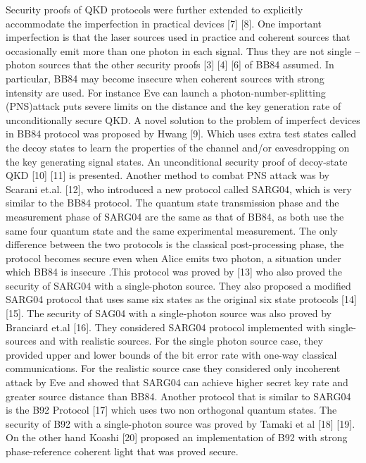 Security proofs of QKD protocols were further extended to explicitly accommodate the imperfection in practical devices [7] [8]. One important imperfection is that the laser sources used in practice and coherent sources that occasionally emit more than one photon in each signal. Thus they are not single –photon sources that the other security proofs [3] [4] [6] of BB84 assumed. In particular, BB84 may become insecure when coherent sources with strong intensity are used. For instance Eve can launch a photon-number-splitting (PNS)attack puts severe limits on the distance and the key generation rate of unconditionally secure QKD. A novel solution to the problem of imperfect devices in BB84 protocol was proposed by Hwang [9]. Which uses extra test states called the decoy states to learn the properties of the channel and/or eavesdropping on the key generating signal states. An unconditional security proof of decoy-state QKD [10] [11] is presented. Another method to combat PNS attack was by Scarani et.al. [12], who introduced a new protocol called SARG04, which is very similar to the BB84 protocol. The quantum state transmission phase and the measurement phase of SARG04 are the same as that of BB84, as both use the same four quantum state and the same experimental measurement. The only difference between the two protocols is the classical post-processing phase, the protocol becomes secure even when Alice emits two photon, a situation under which BB84 is insecure .This protocol was proved by [13] who also proved the security of SARG04 with a single-photon source. They also proposed a modified SARG04 protocol that uses same six states as the original six state protocols [14] [15]. The security of SAG04 with a single-photon source was also proved by Branciard et.al [16]. They considered SARG04 protocol implemented with single-sources and with realistic sources. For the single photon source case, they provided upper and lower bounds of the bit error rate with one-way classical communications. For the realistic source case they considered only incoherent attack by Eve and showed that SARG04 can achieve higher secret key rate and greater source distance than BB84. Another protocol that is similar to SARG04 is the B92 Protocol [17] which uses two non orthogonal quantum states. The security of B92 with a single-photon source was proved by Tamaki et al [18] [19]. On the other hand Koashi [20] proposed an implementation of B92 with strong phase-reference coherent light that was proved secure.

